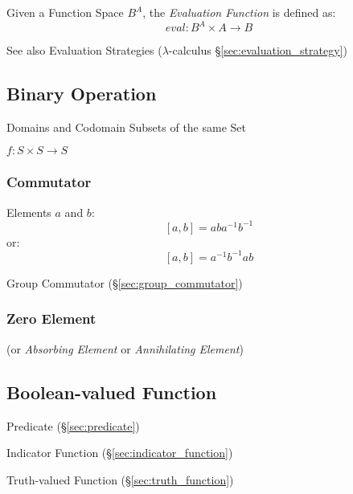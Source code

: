 Given a Function Space $B^A$, the \emph{Evaluation Function} is
defined as:
\[
  eval : B^A \times A \rightarrow B
\]

\fist See also Evaluation Strategies ($\lambda$-calculus
\S\ref{sec:evaluation_strategy})



\subsection{Binary Operation}\label{sec:binary_operation}

Domains and Codomain Subsets of the same Set

$f : S \times S \rightarrow S$



\subsubsection{Commutator}\label{sec:commutator}

Elements $a$ and $b$:
\[
  [a,b] = aba^{-1}b^{-1}
\]
or:
\[
  [a,b] = a^{-1}b^{-1}ab
\]

Group Commutator (\S\ref{sec:group_commutator})



\subsubsection{Zero Element}\label{sec:zero_element}

(or \emph{Absorbing Element} or \emph{Annihilating Element})



\subsection{Boolean-valued Function}\label{sec:boolean_function}

Predicate (\S\ref{sec:predicate})

Indicator Function (\S\ref{sec:indicator_function})

Truth-valued Function (\S\ref{sec:truth_function})



